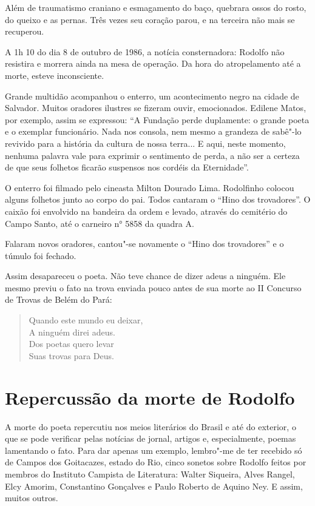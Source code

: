  Além de traumatismo craniano e esmagamento do baço, quebrara ossos do
rosto, do queixo e as pernas. Três vezes seu coração parou, e na
terceira não mais se recuperou. 

 A 1h 10 do dia 8 de outubro de 1986, a notícia consternadora: Rodolfo
não resistira e morrera ainda na mesa de operação. Da hora do
atropelamento até a morte, esteve inconsciente. 

 Grande multidão acompanhou o enterro, um acontecimento negro na cidade
de Salvador. Muitos oradores ilustres se fizeram ouvir, emocionados.
Edilene Matos, por exemplo, assim se expressou: ``A
Fundação perde duplamente: o grande poeta e o exemplar funcionário.
Nada nos consola, nem mesmo a grandeza de sabê"-lo revivido para a
história da cultura de nossa terra... E aqui, neste momento, nenhuma
palavra vale para exprimir o sentimento de perda, a não ser a certeza
de que seus folhetos ficarão suspensos nos cordéis da
Eternidade''. 

 O enterro foi filmado pelo cineasta Milton Dourado Lima. Rodolfinho
colocou alguns folhetos junto ao corpo do pai. Todos cantaram o
``Hino dos trovadores''. O caixão foi
envolvido na bandeira da ordem e levado, através do cemitério do Campo
Santo, até o carneiro n° 5858 da quadra A. 

 Falaram novos oradores, cantou"-se novamente o ``Hino dos
trovadores'' e o túmulo foi fechado. 

 Assim desapareceu o poeta. Não teve chance de dizer adeus a ninguém.
Ele mesmo previu o fato na trova enviada pouco antes de sua morte ao II
Concurso de Trovas de Belém do Pará: 


\begin{verse}
Quando este mundo eu deixar, \\
A ninguém direi adeus. \\
Dos poetas quero levar \\
Suas trovas para Deus. 
\end{verse}


\section{Repercussão da morte de Rodolfo}

 A morte do poeta repercutiu nos meios literários do Brasil e até do
exterior, o que se pode verificar pelas notícias de jornal, artigos e,
especialmente, poemas lamentando o fato. Para dar apenas um exemplo,
lembro"-me de ter recebido só de Campos dos Goitacazes, estado do Rio,
cinco sonetos sobre Rodolfo feitos por membros do Instituto Campista de
Literatura: Walter Siqueira, Alves Rangel, Elcy Amorim, Constantino
Gonçalves e Paulo Roberto de Aquino Ney. E assim, muitos outros. 

